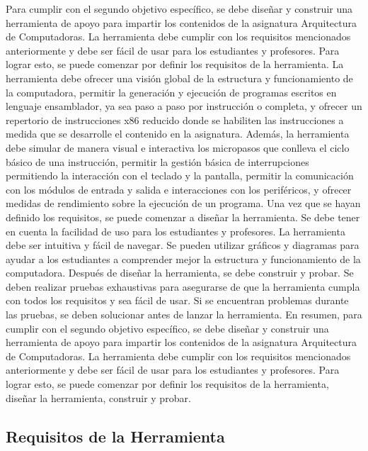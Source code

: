 \documentclass[12pt,twoside]{templates/unerthesis}
\begin{document}
Para cumplir con el segundo objetivo específico, se debe diseñar y construir una herramienta de apoyo para impartir los contenidos de la asignatura Arquitectura de Computadoras. La herramienta debe cumplir con los requisitos mencionados anteriormente y debe ser fácil de usar para los estudiantes y profesores.
Para lograr esto, se puede comenzar por definir los requisitos de la herramienta. La herramienta debe ofrecer una visión global de la estructura y funcionamiento de la computadora, permitir la generación y ejecución de programas escritos en lenguaje ensamblador, ya sea paso a paso por instrucción o completa, y ofrecer un repertorio de instrucciones x86 reducido donde se habiliten las instrucciones a medida que se desarrolle el contenido en la asignatura. Además, la herramienta debe simular de manera visual e interactiva los micropasos que conlleva el ciclo básico de una instrucción, permitir la gestión básica de interrupciones permitiendo la interacción con el teclado y la pantalla, permitir la comunicación con los módulos de entrada y salida e interacciones con los periféricos, y ofrecer medidas de rendimiento sobre la ejecución de un programa.
Una vez que se hayan definido los requisitos, se puede comenzar a diseñar la herramienta. Se debe tener en cuenta la facilidad de uso para los estudiantes y profesores. La herramienta debe ser intuitiva y fácil de navegar. Se pueden utilizar gráficos y diagramas para ayudar a los estudiantes a comprender mejor la estructura y funcionamiento de la computadora.
Después de diseñar la herramienta, se debe construir y probar. Se deben realizar pruebas exhaustivas para asegurarse de que la herramienta cumpla con todos los requisitos y sea fácil de usar. Si se encuentran problemas durante las pruebas, se deben solucionar antes de lanzar la herramienta.
En resumen, para cumplir con el segundo objetivo específico, se debe diseñar y construir una herramienta de apoyo para impartir los contenidos de la asignatura Arquitectura de Computadoras. La herramienta debe cumplir con los requisitos mencionados anteriormente y debe ser fácil de usar para los estudiantes y profesores. Para lograr esto, se puede comenzar por definir los requisitos de la herramienta, diseñar la herramienta, construir y probar.

\hypertarget{requisitos-de-la-herramienta}{%
\subsection{Requisitos de la Herramienta}\label{requisitos-de-la-herramienta}}
\end{document}
